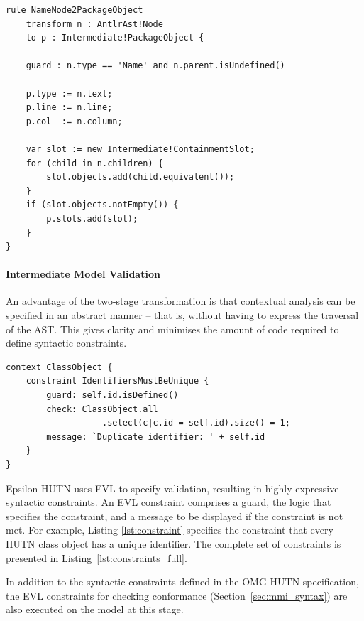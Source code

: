 \begin{lstlisting}[caption=Transforming Nodes to PackageObjects with ETL., label=lst:m2m, language=ETL]
rule NameNode2PackageObject
    transform n : AntlrAst!Node
    to p : Intermediate!PackageObject {

    guard : n.type == 'Name' and n.parent.isUndefined()

    p.type := n.text;
    p.line := n.line;
    p.col  := n.column;

    var slot := new Intermediate!ContainmentSlot;
    for (child in n.children) {
        slot.objects.add(child.equivalent());
    }
    if (slot.objects.notEmpty()) {
        p.slots.add(slot);
    }
}
\end{lstlisting}

\paragraph{Intermediate Model Validation}
An advantage of the two-stage transformation is that contextual analysis can be specified in an abstract manner -- that is, without having to express the traversal of the AST. This gives clarity and minimises the amount of code required to define syntactic constraints.

\begin{lstlisting}[caption=A constraint (in EVL) to check that all identifiers are unique., label=lst:constraint, language=EVL]
context ClassObject {
    constraint IdentifiersMustBeUnique {
        guard: self.id.isDefined()
        check: ClassObject.all
                   .select(c|c.id = self.id).size() = 1;
        message: `Duplicate identifier: ' + self.id
    }
}
\end{lstlisting}

Epsilon HUTN uses EVL \cite{kolovos08evl} to specify validation, resulting in highly expressive syntactic constraints. An EVL constraint comprises a guard, the logic that specifies the constraint, and a message to be displayed if the constraint is not met. For example, Listing \ref{lst:constraint} specifies the constraint that every HUTN class object has a unique identifier. The complete set of constraints is presented in Listing~\ref{lst:constraints_full}.

In addition to the syntactic constraints defined in the OMG HUTN specification, the EVL constraints for checking conformance (Section~\ref{sec:mmi_syntax}) are also executed on the model at this stage.

